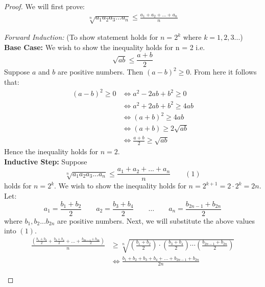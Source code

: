 \documentclass[12pt]{extreport}
\begin{document}
\begin{proof}
We will first prove:
\begin{align*}
\sqrt[n]{a_1 a_2 a_3 ... a_n} \leq \frac{a_1 + a_2 + ... + a_n}{n}
\end{align*}

\begin{flushleft}
\textit{Forward Induction:} (To show statement holds for $n = 2^k$ where $k = 1, 2, 3...$) \\
\textbf{Base Case:} We wish to show the inequality holds for n = 2 i.e. $$\sqrt{ab} \leq \frac{a+b}{2}$$
Suppose $a$ and $b$ are positive numbers. Then $(a-b)^2 \geq 0$. From here it follows that:
\begin{align*}
(a-b)^2 \geq 0 &\iff a^2 - 2ab + b^2 \geq 0 \\
			   &\iff a^2 + 2ab + b^2 \geq 4ab \\
			   &\iff (a+b)^2 \geq 4ab \\
			   &\iff (a+b) \geq 2\sqrt{ab} \\
			   &\iff \frac{a+b}{2} \geq \sqrt{ab}
\end{align*}
Hence the inequality holds for $n=2$.\\
\textbf{Inductive Step:} Suppose $$\sqrt[n]{a_1 a_2 a_3 ... a_n} \leq \frac{a_1 + a_2 + ... + a_n}{n} \qquad (1)$$ holds for $n = 2^k$. We wish to show the inequality holds for $n = 2^{k+1} = 2 \cdot 2^k = 2n$. Let:
$$a_1 = \frac{b_1 + b_2}{2} \qquad a_2 = \frac{b_3 + b_4}{2} \qquad \ldots \qquad a_n = \frac{b_{2n-1} + b_{2n}}{2}$$
where $b_1, b_2 ... b_{2n}$ are positive numbers. Next, we will substitute the above values into $(1)$. 
\begin{align*}
\frac{ (\frac{b_1 + b_2}{2} + \frac{b_3 + b_4}{2} + \ldots + \frac{b_{2n-1} + b_{2n}}{2}) } {n} &\geq \sqrt[n]{(\frac{b_1 + b_2}{2})\cdot(\frac{b_3 + b_4}{2})\cdots (\frac{b_{2n-1} + b_{2n}}{2})} \\&\iff
\frac{b_1 + b_2 + b_3 + b_4 + \ldots + b_{2n-1} + b_{2n}}{2n}
\end{align*}

\end{flushleft}
\end{proof}
\end{document}
